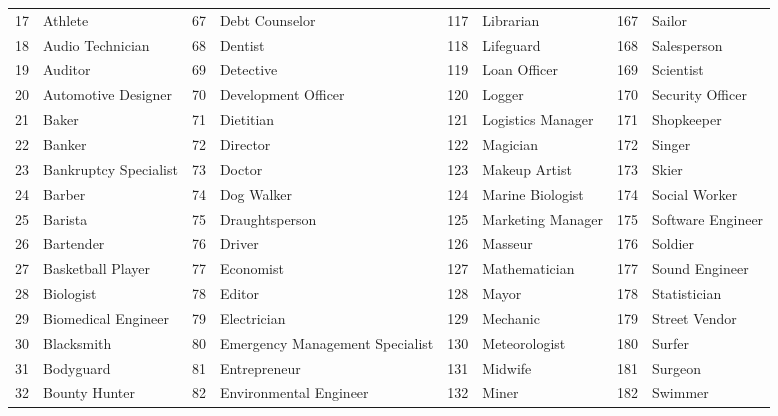 {\begin{longtable}{r p{2.5cm} r p{2.5cm} r p{2.5cm} r p{2.5cm}}
17 & Athlete                 & 67  & Debt Counselor          & 117 & Librarian               & 167 & Sailor                  \\
18 & Audio Technician        & 68  & Dentist                 & 118 & Lifeguard               & 168 & Salesperson             \\
19 & Auditor                 & 69  & Detective               & 119 & Loan Officer            & 169 & Scientist               \\
20 & Automotive Designer     & 70  & Development Officer     & 120 & Logger                  & 170 & Security Officer        \\
21 & Baker                   & 71  & Dietitian               & 121 & Logistics Manager       & 171 & Shopkeeper              \\
22 & Banker                  & 72  & Director                & 122 & Magician                & 172 & Singer                  \\
23 & Bankruptcy Specialist   & 73  & Doctor                  & 123 & Makeup Artist           & 173 & Skier                   \\
24 & Barber                  & 74  & Dog Walker              & 124 & Marine Biologist        & 174 & Social Worker           \\
25 & Barista                 & 75  & Draughtsperson          & 125 & Marketing Manager       & 175 & Software Engineer       \\
26 & Bartender               & 76  & Driver                  & 126 & Masseur                 & 176 & Soldier                 \\
27 & Basketball Player       & 77  & Economist               & 127 & Mathematician           & 177 & Sound Engineer          \\
28 & Biologist               & 78  & Editor                  & 128 & Mayor                   & 178 & Statistician            \\
29 & Biomedical Engineer     & 79  & Electrician             & 129 & Mechanic                & 179 & Street Vendor           \\
30 & Blacksmith              & 80  & Emergency Management Specialist & 130 & Meteorologist    & 180 & Surfer                  \\
31 & Bodyguard               & 81  & Entrepreneur            & 131 & Midwife                 & 181 & Surgeon                 \\
32 & Bounty Hunter           & 82  & Environmental Engineer  & 132 & Miner                   & 182 & Swimmer                 \\

\end{longtable}}
